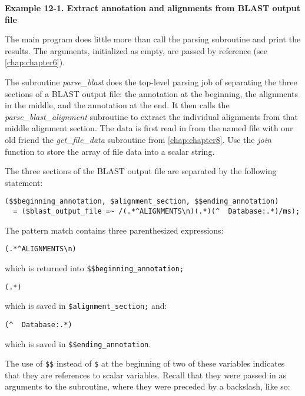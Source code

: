 \textbf{Example 12-1. Extract annotation and alignments from BLAST output file}


The main program does little more than call the parsing subroutine and print the results. The arguments, initialized as empty, are passed by reference (see \autoref{chap:chapter6}).  

The subroutine \textit{parse\_blast} does the top-level parsing job of separating the three sections of a BLAST output file: the annotation at the beginning, the alignments in the middle, and the annotation at the end. It then calls the \textit{parse\_blast\_alignment} subroutine to extract the individual alignments from that middle alignment section. The data is first read in from the named file with our old friend the \textit{get\_file\_data} subroutine from \autoref{chap:chapter8}. Use the \textit{join} function to store the array of file data into a scalar string.

The three sections of the BLAST output file are separated by the following statement:

\begin{lstlisting}
($$beginning_annotation, $alignment_section, $$ending_annotation)
  = ($blast_output_file =~ /(.*^ALIGNMENTS\n)(.*)(^  Database:.*)/ms);
\end{lstlisting}

The pattern match contains three parenthesized expressions: 

\begin{lstlisting}
(.*^ALIGNMENTS\n) 
\end{lstlisting}

which is returned into \verb|$$beginning_annotation;|

\begin{lstlisting}
(.*) 
\end{lstlisting}

which is saved in \verb|$alignment_section;| and:

\begin{lstlisting}
(^  Database:.*) 
\end{lstlisting}

which is saved in \verb|$$ending_annotation|.

The use of \verb|$$| instead of \verb|$| at the beginning of two of these variables indicates that they are references to scalar variables. Recall that they were passed in as arguments to the subroutine, where they were preceded by a backslash, like so: 

